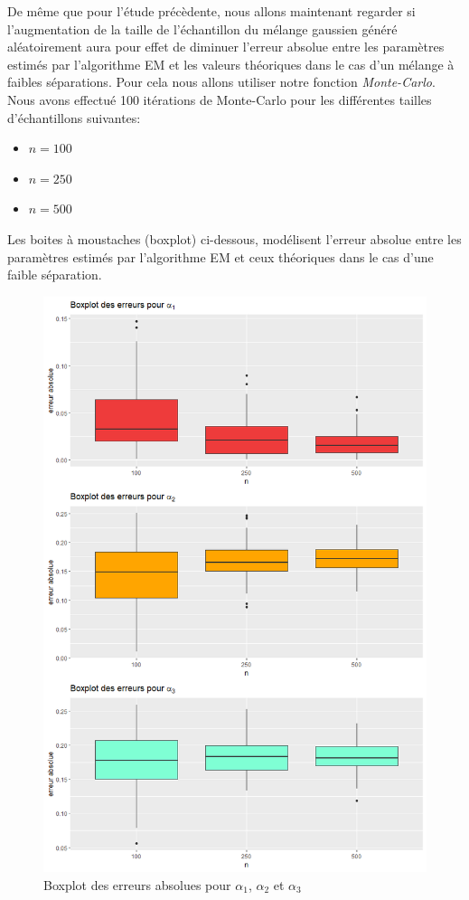 \documentclass[frenchb]{report}
\newcommand{\1}{\mathbbm{1}}
\theoremstyle{definition}\newtheorem{defn}{Définition}
\theoremstyle{definition}\newtheorem{exm}{Exemple}
\theoremstyle{definition}\newtheorem{nota}{Notation}
\theoremstyle{definition}\newtheorem{rem}{Remarque}
\begin{document}
De même que pour l'étude précèdente, nous allons maintenant regarder si l'augmentation de la taille de l'échantillon du mélange gaussien généré aléatoirement aura pour effet de diminuer l'erreur absolue entre les paramètres estimés par l'algorithme EM et les valeurs théoriques dans le cas d'un mélange à faibles séparations. Pour cela nous allons utiliser notre fonction \textit{Monte-Carlo}. \\
Nous avons effectué 100 itérations de Monte-Carlo pour les différentes tailles d'échantillons suivantes:
\begin{itemize}
	\item $n = 100$ \\
	\item $n = 250$ \\
	\item $n = 500$
\end{itemize}
Les boites à moustaches (boxplot) ci-dessous, modélisent l'erreur absolue entre les paramètres estimés par l'algorithme EM et ceux théoriques dans le cas d'une faible séparation.
\begin{figure}[H]
	\centering
	\includegraphics[scale=0.5]{images/bad_alpha.png}
	\caption{Boxplot des erreurs absolues pour $\alpha_1$, $\alpha_2$ et $\alpha_3$}
\end{figure}
\end{document}
